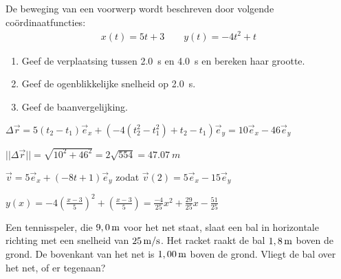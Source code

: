 \documentclass{ximera}
\begin{document}
\begin{exercise} De beweging van een voorwerp wordt beschreven door volgende co\"ordinaatfuncties:
\begin{eqnarray*}
	x(t)=5t+3\qquad y(t)=-4t^2+t
\end{eqnarray*}
\begin{enumerate}
\item Geef de verplaatsing tussen \SI{2,0}{s} en \SI{4,0}{s} en bereken haar grootte.
\item Geef de ogenblikkelijke snelheid op \SI{2,0}{s}.
\item Geef de baanvergelijking.
\end{enumerate}

\begin{oplossing}
$\Delta\vec{r}=5(t_2-t_1)\vec{e}_x+(-4(t_2^2-t_1^2)+t_2-t_1)\vec{e}_y=10\vec{e}_x-46\vec{e}_y$

$||\Delta\vec{r}||=\sqrt{10^2+46^2}=2\sqrt{554}=\SI{47,07}{m}$

$\vec{v}=5\vec{e}_x+(-8t+1)\vec{e}_y$ zodat $\vec{v}(2)=5\vec{e}_x-15\vec{e}_y$

$y(x)=-4\left(\frac{x-3}{5}\right)^2+\left(\frac{x-3}{5}\right)=\frac{-4}{25}x^{2} + \frac{29}{25}x - \frac{51}{25}$

\end{oplossing}




\end{exercise}

\begin{exercise} Een tennisspeler, die $9,0\rm\,m$ voor het net staat, slaat
een bal in horizontale richting met een snelheid van $25\rm\,m/s$.
Het racket raakt de bal $1,8\rm\,m$ boven de grond. De bovenkant van
het net is $1,00\rm\,m$ boven de grond. Vliegt de bal over het net,
of er tegenaan?



\end{exercise}
\end{document}
